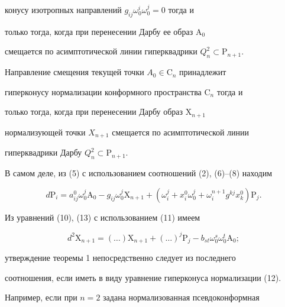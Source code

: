 конусу изотропных направлений $g_{i j}\omega^i_0\omega^j_0=0$ тогда и 


только тогда, когда при перенесении Дарбу ее образ $\mathrm A_0$ 


смещается по асимптотической линии гиперквадрики $Q^2_n\subset\mathrm 


P_{n+1}$. 


 


\begin{thm} 


Направление смещения текущей точки $A_0\in\mathrm C_n$ принадлежит 


гиперконусу нормализации конформного пространства $\mathrm C_n$ тогда и 


только тогда, когда при перенесении Дарбу образ $\mathrm X_{n+1}$ 


нормализующей точки $X_{n+1}$ смещается по асимптотической линии 


гиперквадрики Дарбу $Q^2_n\subset\mathrm P_{n+1}$. 


\end{thm} 


 


В самом деле, из (5) с использованием соотношений (2), (6)--(8) находим 


\begin{equation} 


d\mathrm P_i=a^0_{i j}\omega^j_0\mathrm A_0-g_{i j}\omega^j_0 


\mathrm X_{n+1}+(\omega^j_i+x^0_i\omega^j_0 


+\omega^{n+1}_i g^{k j}x^0_k)\mathrm P_j. 


\end{equation} 


Из уравнений (10), (13) с использованием (11) имеем 


$$ 


d^2\mathrm X_{n+1}=(\dotsc)\mathrm X_{n+1}+(\dotsc)^j 


\mathrm P_j-b_{s t}\omega^s_0\omega^t_0\mathrm A_0; 


$$ 


утверждение теоремы 1 непосредственно следует из последнего 


соотношения, если иметь в виду уравнение гиперконуса нормализации (12). 


 


Например, если при $n=2$ задана нормализованная псевдоконформная 


